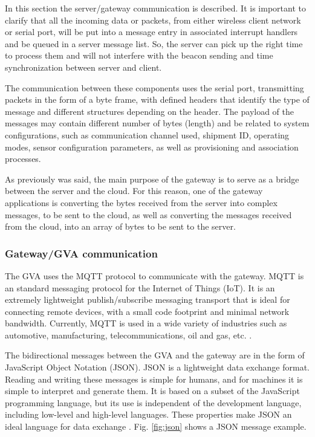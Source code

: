 \documentclass[journal]{IEEEtran}	%
\begin{document}
In this section the server/gateway communication is described. It is important to clarify that all the incoming data or packets, from either wireless client network or serial port, will be put into a message entry in associated interrupt handlers and be queued in a server message list. So, the server can pick up the right time to process them and will not interfere with the beacon sending and time synchronization between server and client.

The communication between these components uses the serial port, transmitting packets in the form of a byte frame, with defined headers that identify the type of message and different structures depending on the header. The payload of the messages may contain different number of bytes (length) and be related to system configurations, such as communication channel used, shipment ID, operating modes, sensor configuration parameters, as well as provisioning and association processes. 

As previously was said, the main purpose of the gateway is to serve as a bridge between the server and the cloud. For this reason, one of the gateway applications is converting the bytes received from the server into complex messages, to be sent to the cloud, as well as converting the messages received from the cloud, into an array of bytes to be sent to the server.


\subsubsection{Gateway/GVA communication}


The GVA uses the MQTT protocol to communicate with the gateway. MQTT is an standard messaging protocol for the Internet of Things (IoT). It is an extremely lightweight publish/subscribe messaging transport that is ideal for connecting remote devices, with a small code footprint and minimal network bandwidth. Currently, MQTT is used in a wide variety of industries such as automotive, manufacturing, telecommunications, oil and gas, etc. \cite{mqtt}.

The bidirectional messages between the GVA and the gateway are in the form of JavaScript Object Notation (JSON). JSON is a lightweight data exchange format. Reading and writing these messages is simple for humans, and for machines it is simple to interpret and generate them. It is based on a subset of the JavaScript programming language, but its use is independent of the development language, including low-level and high-level languages. These properties make JSON an ideal language for data exchange \cite{json}. Fig. \ref{fig:json} shows a JSON message example.
\end{document}
